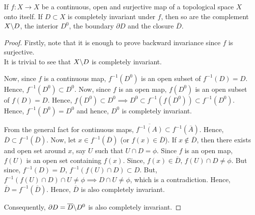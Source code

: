 \begin{theorem}
	If \( f:X\to X \) be a continuous, open and surjective map of a topological space \( X \) onto itself.
	If \( D\subset X \) is completely invariant under \( f \), then so are the complement \( X\backslash D \), the interior \( D^0 \), 
	the boundary \( \partial D \) and the closure \( \overline{D}  \).
\end{theorem}
\begin{proof}
	Firstly, note that it is enough to prove backward invariance since \( f \) is surjective.\\
	It is trivial to see that \( X\backslash D \) is completely invariant. 

	Now, since \( f \) is a continuous map,
	\( f^{-1}(D^0) \) is an open subset of \( f^{-1}(D)=D \). Hence, \( f^{-1}(D^0) \subset D^0 \). Now, since \( f \) is an open map,
	\( f(D^0) \) is an open subset of \( f(D)=D \). Hence, \( f(D^0) \subset D^0 \implies D^0 \subset f^{-1}(f(D^0)) \subset f^{-1}(D^0) \).
	Hence, \( f^{-1}(D^0)=D^0 \) and hence, \( D^0 \) is completely invariant.
	
	From the general fact for continuous maps, \( \overline{ f^{-1}(A)}\subset f^{-1}(\overline{A})  \). Hence, \( \overline{D}\subset f^{-1}(\overline{D})   \). Now, let \( x\in f^{-1}(\overline{D})  \) (or \( f(x)\in \overline{D}  \)). If \( x\not\in \overline{D}  \), then there exists and open set around \( x \), say \( U \) such that \( U\cap D=\phi \). Since \( f \) is an open map, \( f(U) \) is an open set containing \( f(x) \). Since, \( f(x)\in \overline{D}  \), \( f(U)\cap D\neq \phi \). But since, \( f^{-1}(D)=D \), \( f^{-1}(f(U)\cap D)\subset D \). But, \( f^{-1}(f(U)\cap D)\cap U\neq \phi \implies D\cap U\neq \phi\), which is a contradiction. Hence, \( \overline{D}=f^{-1}(\overline{D})   \). Hence, \( \overline{D}  \) is also completely invariant.

	Consequently, \( \partial D=\overline{D}\backslash D^0  \) is also completely invariant.
\end{proof}

